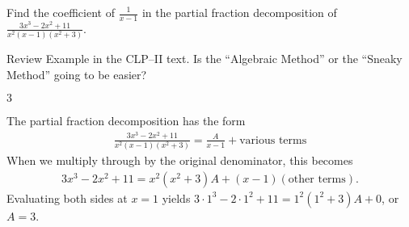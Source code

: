 

\begin{question}[2016Q4]\label{prob_s1.10:sneaky}
Find the coefficient of $\displaystyle \frac{1}{x-1}$ in the partial
fraction decomposition of $\displaystyle\frac{3x^3-2x^2+11}{x^2(x-1)(x^2+3)}$.
\end{question}

\begin{hint}
Review   Example 
in the %
CLP--II text. Is the ``Algebraic Method'' or the ``Sneaky Method'' going to be easier?
\end{hint}

\begin{answer}
$3$
\end{answer}

\begin{solution}
The partial fraction decomposition has the form
\begin{align*}
  \frac{3x^3-2x^2+11}{x^2(x-1)(x^2+3)} = \frac A{x-1} + \text{various terms}
\end{align*}
When we multiply through by the original denominator, this becomes
\begin{align*}
{3x^3-2x^2+11} = {x^2(x^2+3)}A + (x-1)(\text{other terms}).
\end{align*}
Evaluating both sides at $x=1$ yields $3\cdot1^3-2\cdot1^2+11=1^2(1^2+3)A+0$, or $A=3$.
\end{solution}


